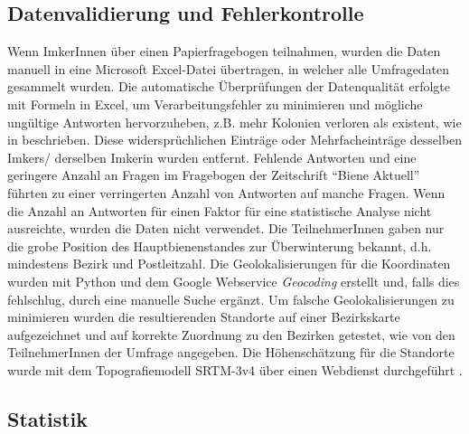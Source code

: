 \subsection{Datenvalidierung und Fehlerkontrolle}

Wenn ImkerInnen über einen Papierfragebogen teilnahmen, wurden die Daten manuell in eine Microsoft Excel-Datei übertragen, in welcher alle Umfragedaten gesammelt wurden. Die automatische Überprüfungen der Datenqualität erfolgte mit Formeln in Excel, um Verarbeitungsfehler zu minimieren und mögliche ungültige Antworten hervorzuheben, z.B. mehr Kolonien verloren als existent, wie in \cite{vanderzee2013, brodschneider2013} beschrieben. Diese widersprüchlichen Einträge oder Mehrfacheinträge desselben Imkers/ derselben Imkerin wurden entfernt. Fehlende Antworten und eine geringere Anzahl an Fragen im Fragebogen der Zeitschrift \enquote{Biene Aktuell} führten zu einer verringerten Anzahl von Antworten auf manche Fragen. Wenn die Anzahl an Antworten für einen Faktor für eine statistische Analyse nicht ausreichte, wurden die Daten nicht verwendet.
\newline
Die TeilnehmerInnen gaben nur die grobe Position des Hauptbienenstandes zur Überwinterung bekannt, d.h. mindestens Bezirk und Postleitzahl. Die Geolokalisierungen für die Koordinaten wurden mit Python und dem Google Webservice \emph{Geocoding} erstellt und, falls dies fehlschlug, durch eine manuelle Suche ergänzt. Um falsche Geolokalisierungen zu minimieren wurden die resultierenden Standorte  auf einer Bezirkskarte aufgezeichnet und auf korrekte Zuordnung zu den Bezirken getestet, wie von den TeilnehmerInnen der Umfrage angegeben. Die Höhenschätzung für die Standorte wurde mit dem Topografiemodell SRTM-3v4 über einen Webdienst durchgeführt \citep{geonames}.

\subsection{Statistik}

